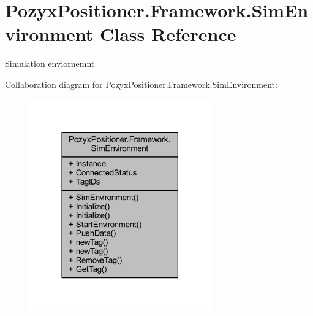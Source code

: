 \hypertarget{class_pozyx_positioner_1_1_framework_1_1_sim_environment}{}\section{Pozyx\+Positioner.\+Framework.\+Sim\+Environment Class Reference}
\label{class_pozyx_positioner_1_1_framework_1_1_sim_environment}


Simulation enviornemnt  




Collaboration diagram for Pozyx\+Positioner.\+Framework.\+Sim\+Environment\+:\nopagebreak
\begin{figure}[H]
\begin{center}
\leavevmode
\includegraphics[width=222pt]{class_pozyx_positioner_1_1_framework_1_1_sim_environment__coll__graph}
\end{center}
\end{figure}
